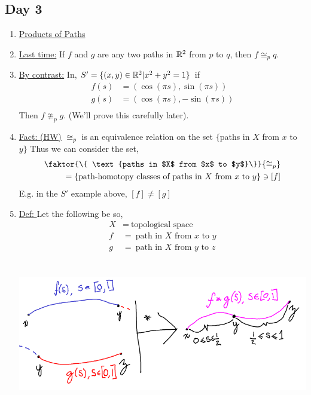 \subsection{Day 3}
    \begin{enumerate}
        \item\underline{Products of Paths}
        \item \underline{Last time:} If $f$ and $g$ are any two paths in $\mathbb{R}^2$ from $p$ to $q$, then $f\cong_{p}q$.
        \item \underline{By contrast:} In, $S'=\{(x,y)\in \mathbb{R}^2| x^2+y^2=1\}$ if
            \begin{align*}
                f(s)&=(\cos(\pi s), \sin(\pi s))\\
                g(s)&=(\cos(\pi s), -\sin(\pi s))\\
            \end{align*}
            Then $f\ncong_{p}g$. (We'll prove this carefully later).
        \item \underline{Fact: (HW)} $\cong_{p}$ is an equivalence relation on the set $\{$paths in $X$ from $x$ to $y\}$
            Thus we can consider the set,
            \begin{align*}
                \faktor{\{ \text{paths in $X$ from $x$ to $y$}\}}{\cong_{p}}\\
                =\{\text{path-homotopy classes of paths in $X$ from $x$ to $y$}\}\ni [f]\\
            \end{align*}
            E.g. in the $S'$ example above, $[f]\neq[g]$
        \item \underline{Def: } Let the following be so,
            \begin{align*}
                X &=\ \text{topological space}\\
                f &=\ \text{path in $X$ from $x$ to $y$}\\
                g &=\ \text{path in $X$ from $y$ to $z$}\\
            \end{align*}\\
            \begin{minipage}[c]{\linewidth}
                \begin{center}
                \includegraphics[width=\linewidth]{images/concatenation.png}

\end{center}
\end{minipage}
\end{enumerate}
